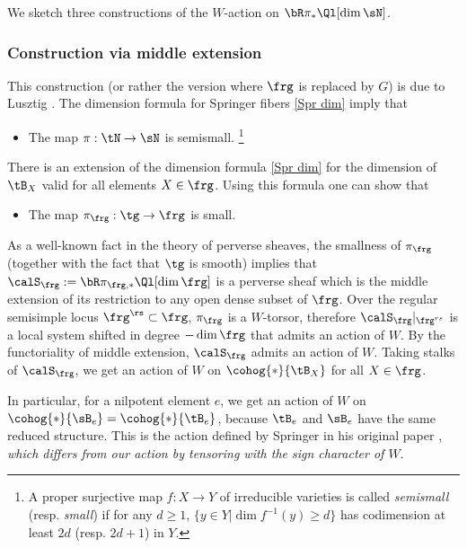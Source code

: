 We sketch three constructions of the $W$-action on $\bR\pi_{*}\Ql[\dim\sN]$.

\subsubsection{Construction via middle extension}\label{sss:mid} This construction (or rather the version where $\frg$ is replaced by $G$) is due to Lusztig \cite[\S3]{LuGreen}. The dimension formula for Springer fibers \eqref{Spr dim} imply that 
\begin{itemize}
\item The map $\pi:\tN\to\sN$ is semismall. \footnote{A proper surjective map $f:X\to Y$ of irreducible varieties is called {\em semismall} (resp. {\em small}) if for any $d\geq 1$, $\{y\in Y|\dim f^{-1}(y)\geq d\}$ has codimension at least $2d$ (resp. $2d+1$) in $Y$.}
\end{itemize}
There is an extension of the dimension formula \eqref{Spr dim} for the dimension of $\tB_{X}$ valid for all elements $X\in \frg$. Using this formula one can show that
\begin{itemize}
\item The map $\pi_{\frg}:\tg\to\frg$ is small.
\end{itemize}
As a well-known fact in the theory of perverse sheaves, the smallness of $\pi_{\frg}$ (together with the fact that $\tg$ is smooth) implies that $\calS_{\frg}:=\bR\pi_{\frg,*}\Ql[\dim\frg]$ is a perverse sheaf which is  the middle extension of its restriction to any open dense subset of $\frg$. Over the regular semisimple locus $\frg^{\rs}\subset \frg$, $\pi_{\frg}$ is a $W$-torsor, therefore $\calS_{\frg}|_{\frg^{rs}}$ is a local system shifted in degree $-\dim\frg$ that admits an action of $W$. By the functoriality of middle extension, $\calS_{\frg}$ admits an action of $W$. Taking stalks of $\calS_{\frg}$, we get an action of $W$ on $\cohog{*}{\tB_{X}}$ for all $X\in\frg$. 

In particular, for a nilpotent element $e$, we get an action of $W$ on $\cohog{*}{\sB_{e}}=\cohog{*}{\tB_{e}}$, because $\tB_{e}$ and $\sB_{e}$ have the same reduced structure. This is the action defined by Springer in his original paper \cite{Springer}, {\em which differs from our action by tensoring with the sign character of $W$}.

